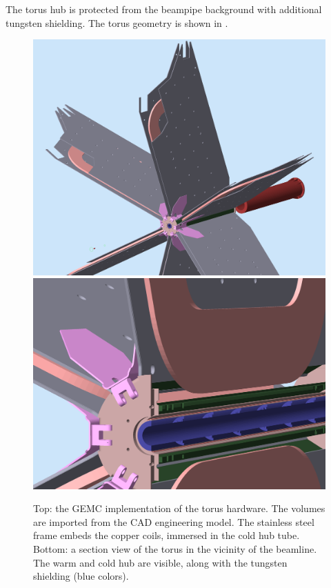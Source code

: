 The torus hub is protected from the beampipe background with additional tungsten shielding.
The torus geometry is shown in .

\begin{figure}
	\centering
	\includegraphics[width=0.95\columnwidth,keepaspectratio]{img/torusGeometry.png}
	\includegraphics[width=0.95\columnwidth,keepaspectratio]{img/torusDetail.png}
	\caption{Top: the GEMC implementation of the torus hardware. The volumes are imported from the CAD engineering model.
            The stainless steel frame embeds the copper coils, immersed in the cold hub tube.
				Bottom: a section view of the torus in the vicinity of the beamline. The warm and cold hub are visible, along with the
				tungsten shielding (blue colors).}
	\label{fig:torus}
\end{figure}


